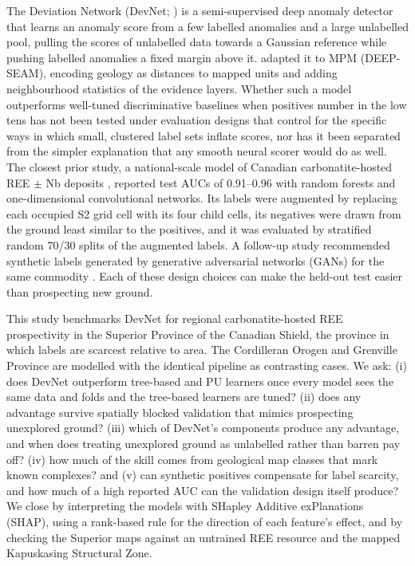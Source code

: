\documentclass[pdflatex,sn-apa]{sn-jnl}
\begin{document}
The Deviation Network (DevNet; \citealp{Pang2019}) is a semi-supervised deep anomaly detector that learns an anomaly score from a few labelled anomalies and a large unlabelled pool, pulling the scores of unlabelled data towards a Gaussian reference while pushing labelled anomalies a fixed margin above it. \citet{Luo2026} adapted it to MPM (DEEP-SEAM), encoding geology as distances to mapped units and adding neighbourhood statistics of the evidence layers. Whether such a model outperforms well-tuned discriminative baselines when positives number in the low tens has not been tested under evaluation designs that control for the specific ways in which small, clustered label sets inflate scores, nor has it been separated from the simpler explanation that any smooth neural scorer would do as well. The closest prior study, a national-scale model of Canadian carbonatite-hosted REE $\pm$ Nb deposits \citep{Parsa2024}, reported test AUCs of 0.91--0.96 with random forests and one-dimensional convolutional networks. Its labels were augmented by replacing each occupied S2 grid cell with its four child cells, its negatives were drawn from the ground least similar to the positives, and it was evaluated by stratified random 70/30 splits of the augmented labels. A follow-up study recommended synthetic labels generated by generative adversarial networks (GANs) for the same commodity \citep{Parsa2025}. Each of these design choices can make the held-out test easier than prospecting new ground.

This study benchmarks DevNet for regional carbonatite-hosted REE prospectivity in the Superior Province of the Canadian Shield, the province in which labels are scarcest relative to area. The Cordilleran Orogen and Grenville Province are modelled with the identical pipeline as contrasting cases. We ask: (i) does DevNet outperform tree-based and PU learners once every model sees the same data and folds and the tree-based learners are tuned? (ii) does any advantage survive spatially blocked validation that mimics prospecting unexplored ground? (iii) which of DevNet's components produce any advantage, and when does treating unexplored ground as unlabelled rather than barren pay off? (iv) how much of the skill comes from geological map classes that mark known complexes? and (v) can synthetic positives compensate for label scarcity, and how much of a high reported AUC can the validation design itself produce? We close by interpreting the models with SHapley Additive exPlanations (SHAP), using a rank-based rule for the direction of each feature's effect, and by checking the Superior maps against an untrained REE resource and the mapped Kapuskasing Structural Zone.
\end{document}
